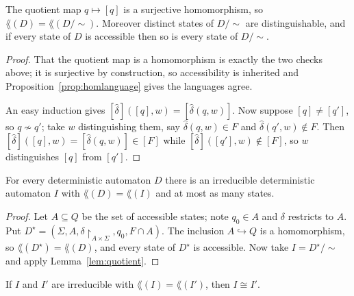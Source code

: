 \begin{lemma}\label{lem:quotient}
	The quotient map $q \mapsto [q]$ is a surjective homomorphism, so $\lang(D) = \lang(D/{\sim})$. Moreover distinct states of $D/{\sim}$ are distinguishable, and if every state of $D$ is accessible then so is every state of $D/{\sim}$.
\end{lemma}

\begin{proof}
	That the quotient map is a homomorphism is exactly the two checks above; it is surjective by construction, so accessibility is inherited and Proposition~\ref{prop:homlanguage} gives the languages agree.

	An easy induction gives $[\hat\delta]([q],w) = [\hat\delta(q,w)]$. Now suppose $[q] \neq [q']$, so $q \not\sim q'$; take $w$ distinguishing them, say $\hat\delta(q,w) \in F$ and $\hat\delta(q',w) \notin F$. Then $[\hat\delta]([q],w) = [\hat\delta(q,w)] \in [F]$ while $[\hat\delta]([q'],w) \notin [F]$, so $w$ distinguishes $[q]$ from $[q']$.
\end{proof}

\begin{theorem}\label{thm:irreducibleexists}
	For every deterministic automaton $D$ there is an irreducible deterministic automaton $I$ with $\lang(D) = \lang(I)$ and at most as many states.
\end{theorem}

\begin{proof}
	Let $A \subseteq Q$ be the set of accessible states; note $q_0 \in A$ and $\delta$ restricts to $A$. Put $D^\star = (\Sigma, A, \delta\restriction_{A\times\Sigma}, q_0, F \cap A)$. The inclusion $A \hookrightarrow Q$ is a homomorphism, so $\lang(D^\star) = \lang(D)$, and every state of $D^\star$ is accessible. Now take $I = D^\star/{\sim}$ and apply Lemma~\ref{lem:quotient}.
\end{proof}

\begin{theorem}\label{thm:irreducibleunique}
	If $I$ and $I'$ are irreducible with $\lang(I) = \lang(I')$, then $I \cong I'$.
\end{theorem}

